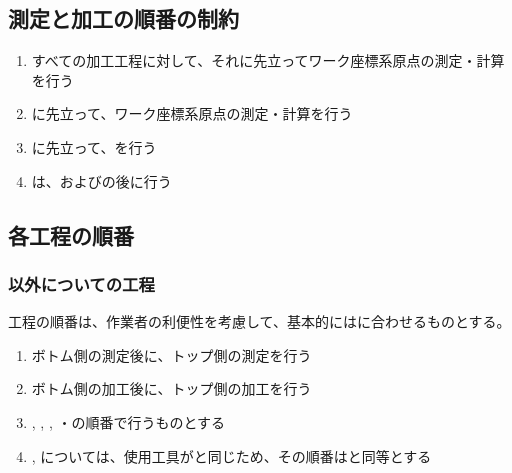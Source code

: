 






\subsection{測定と加工の順番の制約}
\begin{enumerate}[label={\sarrow}]
\item すべての加工工程に対して、それに先立ってワーク座標系原点の測定・計算を行う
\item \DimpleMeasurement に先立って、ワーク座標系原点の測定・計算を行う
\item \DimpleMilling に先立って、\DimpleMeasurement を行う
\item \CenterlineEndFaceDifMeasurement は、\TopOutcutMilling および\BottomOutcutMilling の後に行う
\end{enumerate}


\subsection{各工程の順番}

\subsubsection{\DimpleMilling 以外についての工程}
工程の順番は、作業者の利便性を考慮して、基本的には\MMC に合わせるものとする。
\begin{enumerate}[label={\sarrow}]
\item ボトム側の測定後に、トップ側の測定を行う
\item ボトム側の加工後に、トップ側の加工を行う
\item \EndFacecutMilling, \OutcutMilling, \KeywayMilling, \EndFaceOutCChamferMilling・\EndFaceInCChamferMilling の順番で行うものとする
\item \EndFaceBoringMilling, \IncutBoringMilling については、使用工具が\OutcutMilling と同じため、その順番は\OutcutMilling と同等とする
\end{enumerate}

